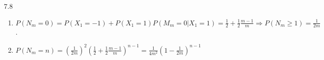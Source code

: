 \documentclass{article}
\begin{document}
    7.8
    \begin{enumerate}
        \item     $P(N_m=0) = P(X_1=-1)
        +P(X_1=1)P(M_m=0|X_1=1)=\frac{1}{2} + \frac{1}{2} \frac{m-1}{m} \Rightarrow P(N_m \geq 1)
         = \frac{1}{2m}$.
        \item $P(N_m = n) = (\frac{1}{2m})^2
         (\frac{1}{2}
         + \frac{1}{2}\frac{m-1}{m})^{n-1} = \frac{1}{4m^2}
         (1-\frac{1}{2m})^{n-1}$
    \end{enumerate}
\end{document}
